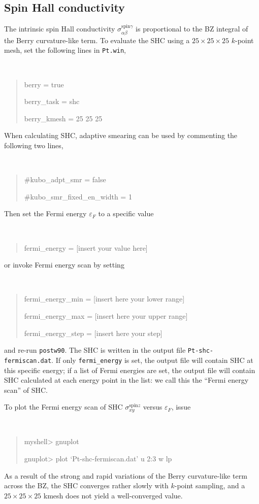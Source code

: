 \documentclass[a4paper,11pt,twoside]{article}
\begin{document}
\subsection*{Spin Hall conductivity}

The intrinsic spin Hall conductivity  
$\sigma_{\alpha\beta}^{\text{spin}\gamma}$ is proportional to the
BZ integral of the Berry curvature-like term. 
To evaluate the SHC using a $25\times
25\times 25$ $k$-point mesh, set the
following lines in {\tt Pt.win}, {\tt
	\begin{quote}
		berry = true
		
		berry\_task = shc                
		
		berry\_kmesh = 25 25 25
		
\end{quote} } 
When calculating SHC, adaptive smearing can be used 
by commenting the following two lines, 
{\tt
	\begin{quote}
		
		\#kubo\_adpt\_smr = false
		
		\#kubo\_smr\_fixed\_en\_width = 1
\end{quote} }
Then set the Fermi energy $\varepsilon_F$ to a specific value 
{\tt
	\begin{quote}
		fermi\_energy = [insert your value here]
\end{quote} } 
or invoke Fermi energy scan by setting 
{\tt
	\begin{quote}
		fermi\_energy\_min = [insert here your lower range]
		
		fermi\_energy\_max = [insert here your upper range]
		
		fermi\_energy\_step = [insert here your step]
		
\end{quote} }
and re-run {\tt postw90}. 
The SHC is written in the
output file {\tt Pt-shc-fermiscan.dat}.
If only {\tt fermi\_energy} is set, the output file will contain 
SHC at this specific energy; if a list of Fermi energies are set, 
the output file will contain SHC calculated at each  
energy point in the list: we call this the ``Fermi energy scan'' of SHC. 

To plot the Fermi energy scan of SHC
$\sigma_{xy}^{\text{spin}z}$ versus $\varepsilon_F$, issue
%
{\tt
	\begin{quote}
		myshell> gnuplot
		
		gnuplot> plot `Pt-shc-fermiscan.dat' u 2:3 w lp
\end{quote} }

As a result of the strong and rapid variations of the 
Berry curvature-like term 
across the BZ, the SHC converges rather slowly with $k$-point
sampling, and a $25\times 25\times 25$ kmesh does not yield a well-converged value.
\end{document}
